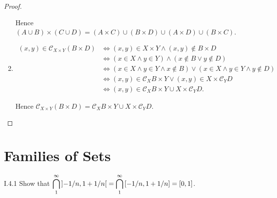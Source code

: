 \begin{proof}
\begin{enumerate}[label={(\alph*)},leftmargin=*]
		      Hence \( (A \cup B) \times (C \cup D) = (A \times C) \cup (B \times D) \cup (A \times D) \cup (B \times C) \).
		\item \begingroup
		      \allowdisplaybreaks%
		      \begin{align*}
			      (x, y) \in \mathscr{C}_{X\times Y}(B\times D) & \iff (x, y) \in X\times Y \land (x, y) \notin B\times D                                     \\
			                                                    & \iff (x \in X \land y \in Y) \land (x \notin B \lor y \notin D)                             \\
			                                                    & \iff (x \in X \land y \in Y \land x \notin B) \lor (x \in X \land y \in Y \land y \notin D) \\
			                                                    & \iff (x, y) \in \mathscr{C}_{X}B \times Y \lor (x, y) \in X \times \mathscr{C}_{Y}D         \\
			                                                    & \iff (x, y) \in \mathscr{C}_{X}B \times Y \cup X \times \mathscr{C}_{Y}D.
		      \end{align*}
		      \endgroup

		      Hence \( \mathscr{C}_{X\times Y}(B\times D) = \mathscr{C}_{X}B \times Y \cup X \times \mathscr{C}_{Y}D \).
	\end{enumerate}
\end{proof}

\section{Families of Sets}

\begin{problem}{I.4.1}
Show that \( \displaystyle\bigcap^{\infty}_{1} \left\rbrack{-1/n, 1 + 1/n}\right\lbrack = \bigcap^{\infty}_{1} \left\lbrack{-1/n, 1 + 1/n}\right\rbrack = [0, 1] \).
\end{problem}

